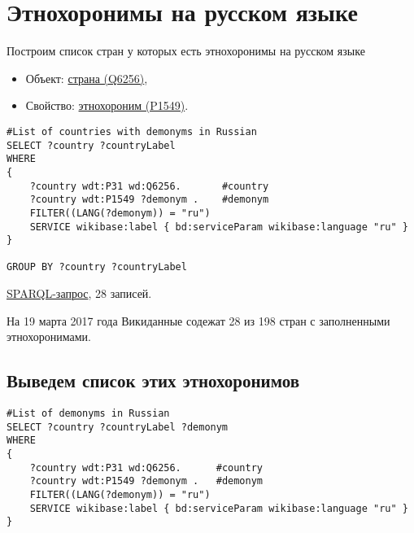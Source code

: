 \section{Этнохоронимы на русском языке}

Построим список стран у которых есть этнохоронимы на русском языке

\begin{itemize}
    \item Объект: \href{https://www.wikidata.org/wiki/Q6256}{страна (Q6256)},
    \item Свойство: \href{https://www.wikidata.org/wiki/Property:P1549}{этнохороним (P1549)}.
\end{itemize}


\begin{lstlisting}[language=SPARQL]
#List of countries with demonyms in Russian
SELECT ?country ?countryLabel 
WHERE
{
	?country wdt:P31 wd:Q6256.       #country
	?country wdt:P1549 ?demonym .    #demonym
	FILTER((LANG(?demonym)) = "ru")
	SERVICE wikibase:label { bd:serviceParam wikibase:language "ru" }
}

GROUP BY ?country ?countryLabel
\end{lstlisting}

\href{https://query.wikidata.org/#%23List%20of%20countries%20with%20demonym%20on%20russian%20language%0ASELECT%20%3Fcountry%20%3FcountryLabel%20%0AWHERE%0A%7B%0A%09%3Fcountry%20wdt%3AP31%20wd%3AQ6256.%20%20%20%20%20%20%20%23country%0A%09%3Fcountry%20wdt%3AP1549%20%3Fdemonym%20.%20%20%20%20%23demonym%0A%09FILTER%28%28LANG%28%3Fdemonym%29%29%20%3D%20%22ru%22%29%0A%09SERVICE%20wikibase%3Alabel%20%7B%20bd%3AserviceParam%20wikibase%3Alanguage%20%22ru%22%20%7D%0A%7D%0A%0AGROUP%20BY%20%3Fcountry%20%3FcountryLabel}{SPARQL-запрос}, 28 записей.

На 19 марта 2017 года Викиданные содежат 28 из 198 стран с заполненными этнохоронимами.

\subsection{Выведем список этих этнохоронимов}

\begin{lstlisting}[language=SPARQL]
#List of demonyms in Russian
SELECT ?country ?countryLabel ?demonym
WHERE
{
	?country wdt:P31 wd:Q6256.      #country
	?country wdt:P1549 ?demonym .   #demonym
	FILTER((LANG(?demonym)) = "ru")
	SERVICE wikibase:label { bd:serviceParam wikibase:language "ru" }
}
\end{lstlisting}

